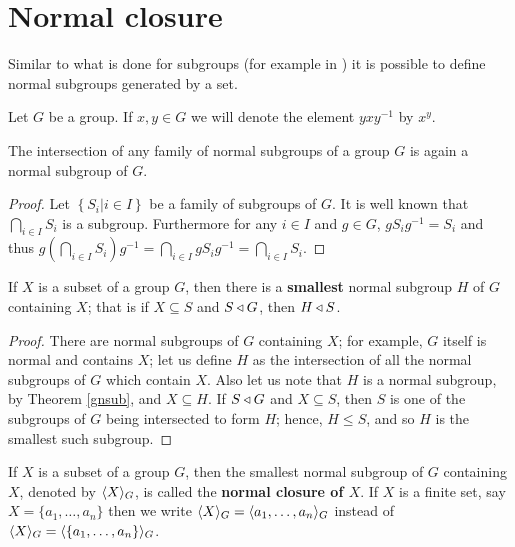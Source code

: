 \section{Normal closure}

Similar to what is done for subgroups (for example in \cite{RotmanITG}) it is possible to define normal subgroups generated by a set.

\begin{definition}
    Let $G$ be a group. If $x,y \in G$ we will denote the element $yxy^{-1}$ by $x^{y}$.
\end{definition}

\begin{theorem}
    \label{gnsub}
    The intersection of any family of normal subgroups of a group $G$ is again a normal subgroup of $G$.
\end{theorem}

\begin{proof}
    Let $\left\{ S_i |i \in I \right\}$ be a family of subgroups of $G$. It is well known that $\bigcap_{i \in I} S_i$ is a subgroup. Furthermore for any $i \in I$ and $g \in G$, $gS_ig^{-1} = S_i$ and thus $g(\bigcap_{i \in I} S_i)g^{-1} = \bigcap_{i \in I} gS_ig^{-1} = \bigcap_{i \in I} S_i$.  
\end{proof}

\begin{theorem}
    If $X$ is a subset of a group $G$, then there is a \textbf{smallest} normal subgroup $H$ of $G$ containing $X$; that is if $X \subseteq S$ and $S \triangleleft G$, then $H \triangleleft S$.   
\end{theorem}

\begin{proof}
    There are normal subgroups of $G$ containing $X$; for example, $G$ itself is normal and contains $X$; let us define $H$ as the intersection of all the normal subgroups of $G$ which contain $X$. Also let us note that $H$ is a normal subgroup, by Theorem \ref{gnsub}, and $X \subseteq H$. If $S \triangleleft G$ and $X \subseteq S$, then $S$ is one of the subgroups of $G$ being intersected to form $H$; hence, $H \le S$, and so $H$ is the smallest such subgroup.
\end{proof}

\begin{definition}
    If $X$ is a subset of a group $G$, then the smallest normal subgroup of $G$ containing $X$, denoted by $\langle X \rangle_G$, is called the \textbf{normal closure of $X$}. If $X$ is a finite set, say $X = \{a_1, \ldots , a_n \}$ then we write $\langle X \rangle_G = \langle a_1, \ldots , a_n \rangle_G$ instead of $\langle X \rangle_G = \langle \left\{a_1, \ldots , a_n\right\} \rangle_G$.
\end{definition}

